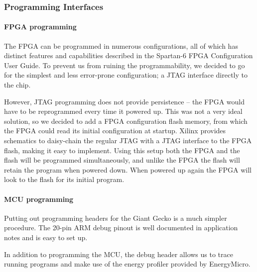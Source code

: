 
\subsubsection{Programming Interfaces}

\paragraph{FPGA programming}
The FPGA can be programmed in numerous configurations, all of which has distinct
features and capabilities described in the Spartan-6 FPGA Configuration User
Guide. To prevent us from ruining the programmability, we decided to go for the
simplest and less error-prone configuration; a JTAG interface directly to the
chip.

However, JTAG programming does not provide persistence -- the FPGA would
have to be reprogrammed every time it powered up. This was not a very ideal
solution, so we decided to add a FPGA configuration flash memory, from which
the FPGA could read its initial configuration at startup. Xilinx provides
schematics to daisy-chain the regular JTAG with a
JTAG interface to the FPGA flash, making it easy to implement. Using this
setup both the FPGA and the flash will be programmed simultaneously, and
unlike the FPGA the flash will retain the program when powered down. When
powered up again the FPGA will look to the flash for its initial program.

\paragraph{MCU programming}
Putting out programming headers for the Giant Gecko is a much simpler procedure.
The 20-pin ARM debug pinout is well documented in application notes and is easy
to set up.

In addition to programming the MCU, the debug header allows us to trace running
programs and make use of the energy profiler provided by EnergyMicro.